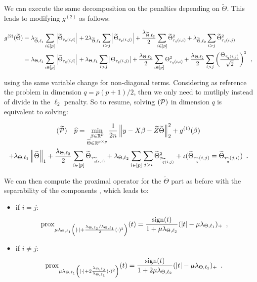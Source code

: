 \documentclass[a4]{article}
\begin{document}
We can execute the same decomposition on the penalties depending on $\widetilde\Theta$.
This leads to modifying $g^{(2)}$ as follows:

\begin{align*}
	g^{(2)}(\widetilde\Theta)
	&= \lambda_{\widetilde\Theta, \ell_1} \sum_{i\in [p]}\left \vert \widetilde\Theta_{\tau_q(i,i)} \right \vert + 2\lambda_{\widetilde\Theta, \ell_1} \sum_{i>j} \left \vert \widetilde\Theta_{\tau_q(i,j)} \right \vert +
 \frac{\lambda_{\widetilde\Theta, \ell_2}}{2} \sum_{i\in [p]}\widetilde\Theta_{\tau_q(i,i)}^2 + \lambda_{\widetilde\Theta, \ell_2}\sum_{i>j} \widetilde\Theta_{\tau_q(i,j)}^2 \\
 	& = \lambda_{\Theta, \ell_1} \sum_{i\in [p]}\left \vert \widetilde\Theta_{\tau_q(i,i)} \right \vert + \lambda_{\Theta, \ell_1} \sum_{i>j} \left \vert \Theta_{\tau_q(i,j)} \right \vert +
	 \frac{\lambda_{\Theta, \ell_2}}{2} \sum_{i\in [p]}\Theta_{\tau_q(i,i)}^2 + \frac{\lambda_{\Theta, \ell_2}}{2}\sum_{i>j} \left(\frac{\Theta_{\tau_q(i,j)}}{\sqrt{2}}\right)^2 \enspace,
\end{align*}

using the same variable change for non-diagonal terms. Considering as reference the problem in dimension $q=p(p+1)/2$, then we only need to mutliply instead of divide in the $\ell_2$ penalty.
So to resume, solving $(\mathcal{P})$ in dimension $q$ is equivalent to solving:


\begin{multline}\label{eq:equiv_full}
	(\widetilde{\mathcal{P}}) \quad \widehat{p}
	 = \min_{\substack{\beta \in \mathbb{R}^p \\ \widetilde \Theta \in \mathbb{R}^{p\times p}}}
	\frac{1}{2n}\left \lVert y - X\beta - \widetilde Z\widetilde \Theta \right \rVert_2^2 + g^{(1)}(\beta) \\
	 + \lambda_{\Theta, \ell_1}\left \lVert \widetilde\Theta \right \rVert_1 + \frac{\lambda_{\Theta, \ell_2}}{2}\sum_{i\in[p]} \widetilde\Theta_{\tau_{\widetilde q(i,i)}}
	 + \lambda_{\Theta, \ell_2}\sum_{i\in [p]}\sum_{j>i} \widetilde \Theta_{\tau_{\widetilde q(i,j)}}^2 + \iota(\widetilde \Theta_{\tau_{\widetilde q}(i,j)}=\widetilde \Theta_{\tau_{\widetilde q}(j,i)}) \enspace.
\end{multline}

We can then compute the proximal operator for the $\widetilde\Theta$ part as before with the separability of the components \citep[p.~135]{Beck17}, which leads to:

\begin{itemize}
	\item if $i=j$:
	\[\operatorname{prox}_{\mu\lambda_{\Theta, \ell_1}\left(|\cdot| + \frac{\lambda_{\Theta, \ell_2}/\lambda_{\Theta, \ell_1}}{2}(\cdot)^2\right)}(t)=\frac{\operatorname{sign}(t)}{1+\mu\lambda_{\Theta, \ell_2}}(|t| - \mu\lambda_{\Theta, \ell_1})_+ \enspace,\]
	\item if $i\neq j$:
	\[\operatorname{prox}_{\mu\lambda_{\Theta, \ell_1}\left(|\cdot| + 2\frac{\lambda_{\Theta, \ell_2}}{\lambda_{\Theta, \ell_1}}(\cdot)^2\right)}(t)=\frac{\operatorname{sign}(t)}{1+2\mu\lambda_{\Theta, \ell_2}}(|t| - \mu\lambda_{\Theta, \ell_1})_+ \enspace.\]

\end{itemize}
\end{document}
